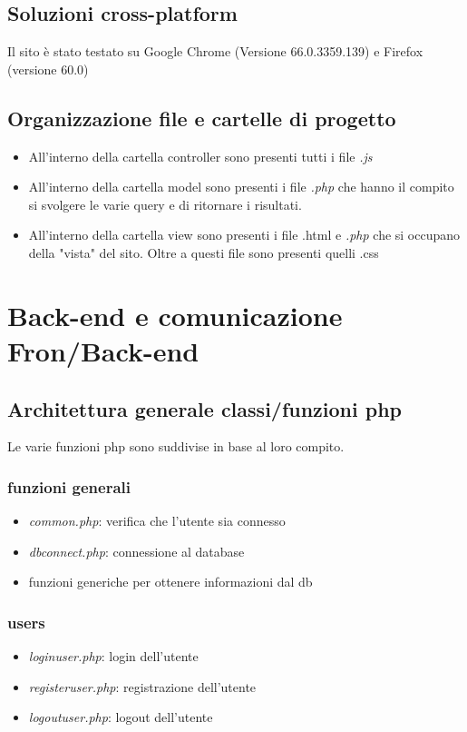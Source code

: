\documentclass[12pt]{extarticle}
\begin{document}
\subsection{Soluzioni cross-platform}
Il sito è stato testato su Google Chrome (Versione 66.0.3359.139) e Firefox (versione 60.0)

\subsection{Organizzazione file e cartelle di progetto}
\begin{itemize}
    \item All'interno della cartella controller sono presenti tutti i file \textit{.js}
    \item All'interno della cartella model sono presenti i file \textit{.php} che
    hanno il compito si svolgere le varie query e di ritornare i risultati.
    \item All'interno della cartella view sono presenti i file .html e \textit{.php} che
    si occupano della "vista" del sito. Oltre a questi file sono presenti
    quelli .css
\end{itemize}

\section{Back-end e comunicazione Fron/Back-end}
\subsection{Architettura generale classi/funzioni php}
Le varie funzioni php sono suddivise in base al loro compito.

\subsubsection*{funzioni generali}
\begin{itemize}
    \item \textit{common.php}: verifica che l'utente sia connesso
    \item \textit{dbconnect.php}: connessione al database
    \item funzioni generiche per ottenere informazioni dal db
\end{itemize}

\subsubsection*{users}
\begin{itemize}
    \item \textit{loginuser.php}: login dell'utente
    \item \textit{registeruser.php}: registrazione dell'utente
    \item \textit{logoutuser.php}: logout dell'utente
\end{itemize}
\end{document}
